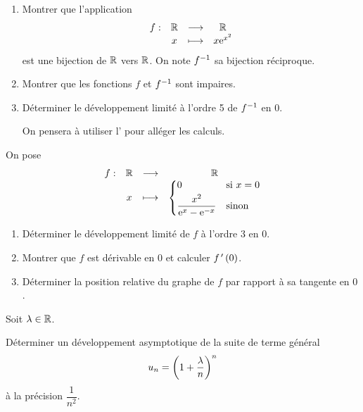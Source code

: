 \begin{corr}
\end{corr}

\begin{exo}
\begin{enumerate}
\item Montrer que l'application \[\begin{array}[t]{cccc}f : & \mathbb{R} & \longrightarrow & \mathbb{R} \\ & x & \longmapsto & x\mathrm{e}^{x^2}\end{array}\] est une bijection de \(\mathbb{R}\) vers \(\mathbb{R}\). On note \(f^{-1}\) sa bijection réciproque. \\

\item Montrer que les fonctions \(f\) et \(f^{-1}\) sont impaires. \\

\item Déterminer le développement limité à l'ordre 5 de \(f^{-1}\) en \(0\).

On pensera à utiliser l' pour alléger les calculs.
\end{enumerate}
\end{exo}

\begin{corr}
\end{corr}

\begin{exo}
On pose \[\begin{array}[t]{cccc}f : & \mathbb{R} & \longrightarrow & \mathbb{R} \\ & x & \longmapsto & \begin{dcases}
0 &\text{si }x=0 \\
\dfrac{x^2}{\mathrm{e}^{x}-\mathrm{e}^{-x}} &\text{sinon}
\end{dcases}\end{array}\]

\begin{enumerate}
\item Déterminer le développement limité de \(f\) à l'ordre 3 en \(0\). \\

\item Montrer que \(f\) est dérivable en \(0\) et calculer \(f^{\,\prime}\left(0\right)\). \\

\item Déterminer la position relative du graphe de \(f\) par rapport à sa tangente en \(0\).
\end{enumerate}
\end{exo}

\begin{corr}
\end{corr}

\begin{exo}
Soit \(\lambda\in\mathbb{R}\).

Déterminer un développement asymptotique de la suite de terme général \[u_n=\left(1+\dfrac{\lambda}{n}\right)^n\] à la précision \(\dfrac{1}{n^2}\).
\end{exo}

